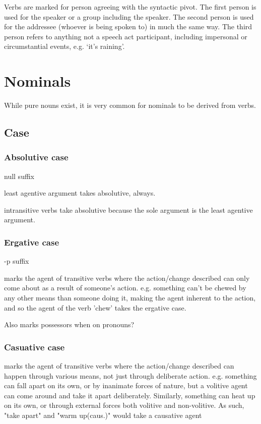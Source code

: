 \documentclass[smallroyalvopaper,9pt]{memoir} %
\begin{document}
Verbs are marked for person agreeing with the syntactic pivot. The first person is used for the speaker or a group including the speaker. The second person is used for the addressee (whoever is being spoken to) in much the same way. The third person refers to anything not a speech act participant, including impersonal or circumstantial events, e.g. `it's raining'.

\chapter{Nominals}

While pure nouns exist, it is very common for nominals to be derived from verbs.

\section{Case}

\subsection{Absolutive case}

null suffix

least agentive argument takes absolutive, always. 

intransitive verbs take absolutive because the sole argument is the least agentive argument.

\subsection{Ergative case}

-p suffix

marks the agent of transitive verbs where the action/change described can only come about as a result of someone's action. e.g. something can't be chewed by any other means than someone doing it, making the agent inherent to the action, and so the agent of the verb 'chew' takes the ergative case. 

Also marks possessors when on pronouns?

\subsection{Casuative case}

marks the agent of transitive verbs where the action/change described can happen through various means, not just through deliberate action. e.g. something can fall apart on its own, or by inanimate forces of nature, but a volitive agent can come around and take it apart deliberately. Similarly, something can heat up on its own, or through external forces both volitive and non-volitive. As such, "take apart" and "warm up(caus.)" would take a causative agent
\end{document}
